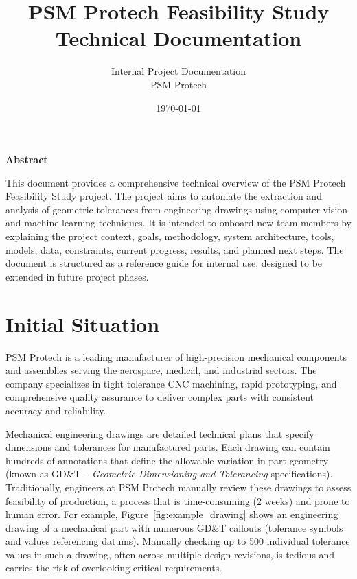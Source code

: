 \documentclass[11pt,a4paper]{article}
\title{\textbf{PSM Protech Feasibility Study}\\Technical Documentation}
\author{Internal Project Documentation \\ PSM Protech}
\date{\today}
\begin{document}
\maketitle
\thispagestyle{empty}
\begin{center}
\textbf{Abstract}
\end{center}
\noindent
This document provides a comprehensive technical overview of the PSM Protech Feasibility Study project. The project aims to automate the extraction and analysis of geometric tolerances from engineering drawings using computer vision and machine learning techniques. It is intended to onboard new team members by explaining the project context, goals, methodology, system architecture, tools, models, data, constraints, current progress, results, and planned next steps. The document is structured as a reference guide for internal use, designed to be extended in future project phases.

\vfill
\tableofcontents
\newpage

\section{Initial Situation}
PSM Protech is a leading manufacturer of high-precision mechanical components and assemblies serving the aerospace, medical, and industrial sectors. The company specializes in tight tolerance CNC machining, rapid prototyping, and comprehensive quality assurance to deliver complex parts with consistent accuracy and reliability.

Mechanical engineering drawings are detailed technical plans that specify dimensions and tolerances for manufactured parts. Each drawing can contain hundreds of annotations that define the allowable variation in part geometry (known as GD\&T -- \emph{Geometric Dimensioning and Tolerancing} specifications). Traditionally, engineers at PSM Protech manually review these drawings to assess feasibility of production, a process that is time-consuming (2 weeks) and prone to human error. For example, Figure~\ref{fig:example_drawing} shows an engineering drawing of a mechanical part with numerous GD\&T callouts (tolerance symbols and values referencing datums). Manually checking up to 500 individual tolerance values in such a drawing, often across multiple design revisions, is tedious and carries the risk of overlooking critical requirements.
\end{document}
